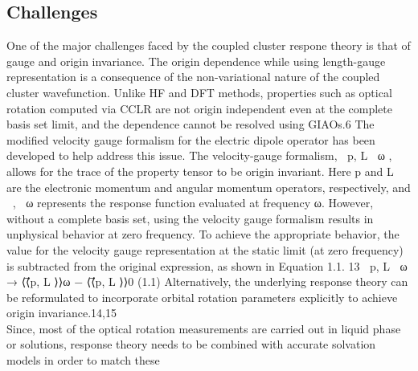 \subsection{Challenges}
One of the major challenges faced by the coupled cluster respone theory is that of gauge and origin invariance.
The origin dependence while using length-gauge representation is a consequence of the non-variational nature of the 
coupled cluster wavefunction. Unlike HF and DFT methods, properties such as optical rotation computed via CCLR 
are not origin independent even at the complete basis set limit, and the dependence cannot be resolved using GIAOs.6 
The modified velocity gauge formalism for the electric dipole operator has been developed to help address this 
issue. The velocity-gauge formalism, ⟨⟨⃗p, L⃗ ⟩⟩ω , allows for the trace of the property tensor to be origin 
invariant. Here ⃗p and L⃗ are the electronic momentum and angular momentum operators, respectively, and 
⟨⟨, ⟩⟩ω represents the response function evaluated at frequency ω. However, without a complete basis
set, using the velocity gauge formalism results in unphysical behavior at zero frequency. To achieve the 
appropriate behavior, the value for the velocity gauge representation at the static limit (at zero frequency) 
is subtracted from the original expression, as shown in Equation 1.1. 13
⟨⟨⃗p, L⃗ ⟩⟩ω → ⟨⟨⃗p, L⃗ ⟩⟩ω − ⟨⟨⃗p, L⃗ ⟩⟩0 (1.1) Alternatively, the underlying response theory can be reformulated to incorporate 
orbital rotation parameters explicitly to achieve origin invariance.14,15\\
Since, most of the optical rotation measurements are carried out in liquid phase or solutions,
response theory needs to be combined with accurate solvation models in order to match these
